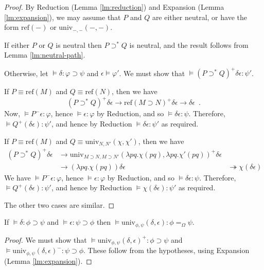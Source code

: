 \documentclass[a4paper,UKenglish]{lipics-v2016}
\newcommand*{\reff}[1]{\ensuremath{\mathrm{ref} \left( {#1} \right)}}
\newcommand*{\univ}[4]{\ensuremath{\mathrm{univ}_{{#1}, {#2}} \left({#3} , {#4} \right)}}
\theoremstyle{plain}
\theoremstyle{definition}
\begin{document}
\begin{proof}
By Reduction (Lemma \ref{lm:reduction}) and Expansion (Lemma \ref{lm:expansion}), we may assume that $P$ and $Q$ are either neutral, or have the form $\reff{-}$ or $\univ{-}{-}{-}{-}$.

If either $P$ or $Q$ is neutral then $P \supset^* Q$ is neutral, and the result follows from Lemma \ref{lm:neutral-path}.

Otherwise, let $\models \delta : \varphi \supset \psi$ and $\epsilon \models \varphi'$.  We must show that $\models (P \supset^* Q)^+ \delta \epsilon : \psi'$.

If $P \equiv \reff{M}$ and $Q \equiv \reff{N}$, then we have
$$ (P \supset^* Q)^+ \delta \epsilon \rightarrow \reff{M \supset N}^+ \delta \epsilon \rightarrow \delta \epsilon \enspace . $$
Now, $\models P^- \epsilon : \varphi$, hence $\models \epsilon : \varphi$ by Reduction, and so $\models \delta \epsilon : \psi$.  Therefore, $\models Q^+ (\delta \epsilon) : \psi'$,
and hence by Reduction $\models \delta \epsilon : \psi'$ as required.

If $P \equiv \reff{M}$ and $Q \equiv \univ{N}{N'}{\chi}{\chi'}$, then we have
\begin{align*}
(P \supset^* Q)^+ \delta \epsilon & \rightarrow \univ{M \supset N}{M \supset N'}{\lambda pq.\chi(pq)}{\lambda pq.\chi'(pq)}^+ \delta \epsilon \\
& \rightarrow (\lambda pq.\chi(pq)) \delta \epsilon
& \twoheadrightarrow \chi (\delta \epsilon)
\end{align*}
We have $\models P^- \epsilon : \varphi$, hence $\models \epsilon : \varphi$ by Reduction, and so $\models \delta \epsilon : \psi$.  Therefore,
$\models Q^+ (\delta \epsilon) : \psi'$, and hence by Reduction $\models \chi (\delta \epsilon) : \psi'$ as required.

The other two cases are similar.
\end{proof}

\begin{lemma}
\label{lm:univ-compute}
If $\models \delta : \phi \supset \psi$ and $\models \epsilon : \psi \supset \phi$ then $\models \univ{\phi}{\psi}{\delta}{\epsilon} : \phi =_\Omega \psi$.
\end{lemma}

\begin{proof}
We must show that $\models \univ{\phi}{\psi}{\delta}{\epsilon}^+ : \phi \supset \psi$ and $\models \univ{\phi}{\psi}{\delta}{\epsilon}^- : \psi \supset \phi$.
These follow from the hypotheses, using Expansion (Lemma \ref{lm:expansion}).
\end{proof}
\end{document}

